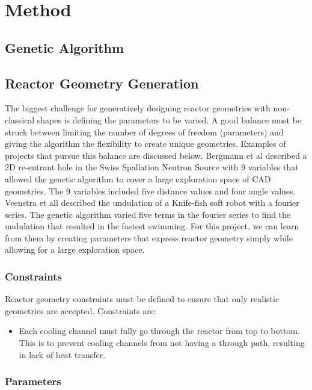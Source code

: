 \section{Method}

\subsection{Genetic Algorithm}

\subsection{Reactor Geometry Generation}
The biggest challenge for generatively designing reactor geometries with 
non-classical shapes is defining the parameters to be varied. 
A good balance must be struck between limiting the number of degrees of freedom 
(parameters) and giving the algorithm the flexibility to create unique geometries.
Examples of projects that pursue this balance are discussed below. 
Bergmann et al \cite{bergmann_simulation_2018} described a 2D re-entrant hole 
in the Swiss Spallation Neutron Source with 9 variables that allowed the genetic 
algorithm to cover a large exploration space of CAD geometries. 
The 9 variables included five distance values and four angle values. 
Veenstra et all \cite{veenstra_evolution_2018} described the undulation of 
a Knife-fish soft robot with a fourier series. 
The genetic algorithm varied five terms in the fourier series to find the undulation 
that resulted in the fastest swimming. 
For this project, we can learn from them by creating parameters that
express reactor geometry simply while allowing for a large exploration space. 

\subsubsection{Constraints}
Reactor geometry constraints must be defined to ensure that only realistic 
geometries are accepted. 
Constraints are: 
\begin{itemize}
    \item Each cooling channel must fully go through the reactor from top to 
    bottom. This is to prevent cooling channels from not having a through 
    path, resulting in lack of heat transfer. 
\end{itemize}

\subsubsection{Parameters}

